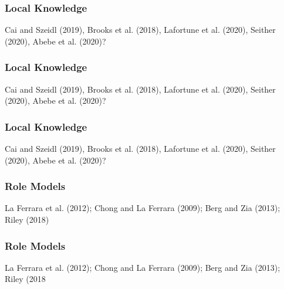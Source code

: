 \documentclass[hideothersubsections, usenames,dvipsnames,11pt]{beamer}
\newenvironment{itemize_2pt}{\itemize\addtolength{\itemsep}{2pt}}{\enditemize}
\begin{document}

\begin{frame}
\frametitle{Local Knowledge}
	\begin{itemize_2pt}
	\item Cai and Szeidl (2019), Brooks et al. (2018), Lafortune et al. (2020), Seither (2020), Abebe et al. (2020)?
	\vspace{0.1in}
	\end{itemize_2pt}
\end{frame}

\begin{frame}
\frametitle{Local Knowledge}
	\begin{itemize_2pt}
	\item Cai and Szeidl (2019), Brooks et al. (2018), Lafortune et al. (2020), Seither (2020), Abebe et al. (2020)?
	\vspace{0.1in}
	\end{itemize_2pt}
\end{frame}

\begin{frame}
\frametitle{Local Knowledge}
	\begin{itemize_2pt}
	\item Cai and Szeidl (2019), Brooks et al. (2018), Lafortune et al. (2020), Seither (2020), Abebe et al. (2020)?
	\vspace{0.1in}
	\end{itemize_2pt}
\end{frame}


\begin{frame}
\frametitle{Role Models}
	\begin{itemize_2pt}
	\item  La Ferrara et al. (2012); Chong and La Ferrara (2009); Berg and Zia (2013); Riley (2018)
	\vspace{0.1in}
	\end{itemize_2pt}
\end{frame}

\begin{frame}
\frametitle{Role Models}
	\begin{itemize_2pt}
	\item  La Ferrara et al. (2012); Chong and La Ferrara (2009); Berg and Zia (2013); Riley (2018
	\vspace{0.1in}
	\end{itemize_2pt}
\end{frame}
\end{document}

